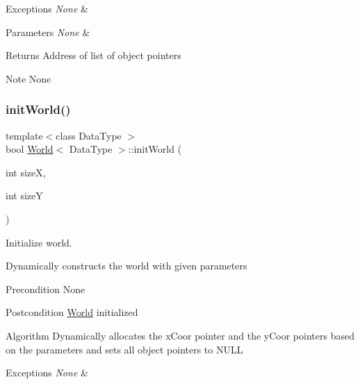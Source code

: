 \begin{DoxyExceptions}{Exceptions}
{\em None} & \\
\hline
\end{DoxyExceptions}

\begin{DoxyParams}{Parameters}
{\em None} & \\
\hline
\end{DoxyParams}
\begin{DoxyReturn}{Returns}
Address of list of object pointers
\end{DoxyReturn}
\begin{DoxyNote}{Note}
None 
\end{DoxyNote}
\hypertarget{class_world_a98a358741fbc2e570426bba0bee7b326}{}\label{class_world_a98a358741fbc2e570426bba0bee7b326} 
\subsubsection{\texorpdfstring{init\+World()}{initWorld()}}
{\footnotesize\ttfamily template$<$class Data\+Type $>$ \\
bool \hyperlink{class_world}{World}$<$ Data\+Type $>$\+::init\+World (\begin{DoxyParamCaption}\item[{int}]{sizeX,  }\item[{int}]{sizeY }\end{DoxyParamCaption})}



Initialize world. 

Dynamically constructs the world with given parameters

\begin{DoxyPrecond}{Precondition}
None
\end{DoxyPrecond}
\begin{DoxyPostcond}{Postcondition}
\hyperlink{class_world}{World} initialized
\end{DoxyPostcond}
\begin{DoxyParagraph}{Algorithm}
Dynamically allocates the x\+Coor pointer and the y\+Coor pointers based on the parameters and sets all object pointers to N\+U\+LL
\end{DoxyParagraph}

\begin{DoxyExceptions}{Exceptions}
{\em None} & \\
\hline
\end{DoxyExceptions}

